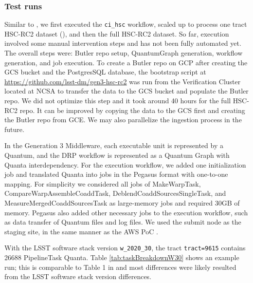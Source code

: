 \subsubsection{Test runs}

Similar to , we first executed the \texttt{ci\_hsc} workflow, scaled up to process one tract HSC-RC2 dataset (), and then the full HSC-RC2 dataset.
So far, execution involved some manual intervention steps and has not been fully automated yet.
The overall steps were: Butler repo setup, QuantumGraph generation, workflow generation, and job execution.
To create a Butler repo on GCP after creating the GCS bucket and the PostgresSQL database, the bootstrap script at \url{https://github.com/lsst-dm/gen3-hsc-rc2} was run from the Verification Cluster located at NCSA to transfer the data to the GCS bucket and populate the Butler repo.
We did not optimize this step and it took around 40 hours for the full HSC-RC2 repo.
It can be improved by copying the data to the GCS first and creating the Butler repo from GCE.
We may also parallelize the ingestion process in the future.

In the Generation 3 Middleware, each executable unit is represented by a Quantum, and the DRP workflow is represented as a Quantum Graph with Quanta interdependency.
For the execution workflow, we added one initialization job and translated Quanta into jobs in the Pegasus format with one-to-one mapping.
For simplicity we considered all jobs of MakeWarpTask, CompareWarpAssembleCoaddTask, DeblendCoaddSourcesSingleTask, and MeasureMergedCoaddSourcesTask as large-memory jobs and required 30GB of memory.
Pegasus also added other necessary jobs to the execution workflow, such as data transfer of Quantum files and log files.
We used the submit node as the staging site, in the same manner as the AWS PoC .

With the LSST software stack version \texttt{w\_2020\_30}, the tract \texttt{tract=9615} contains 26688 PipelineTask Quanta.
Table \ref{tab:taskBreakdownW30} shows an example run; this is comparable to Table 1 in  and most differences were likely resulted from the LSST software stack version differences.

%
%


